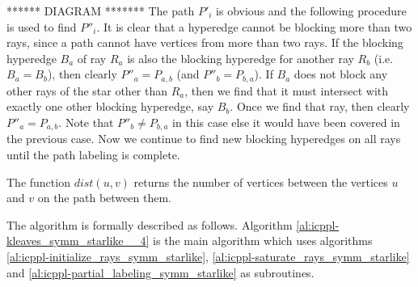\documentclass{llncs}
\begin{document}
****** DIAGRAM *******
The path $P'_i$ is obvious and the following procedure is used to find
$P''_i$. It is clear that a hyperedge cannot be blocking more than two rays,
since a path cannot have vertices from more than two rays. If the blocking 
hyperedge $B_a$ of ray $R_a$ is also the blocking hyperedge for
another ray $R_b$ (i.e. $B_a = B_b$), then clearly $P''_a = P_{a,b}$
(and $P''_b = P_{b,a}$). If $B_a$ does not block any other rays of the
star other than $R_a$, then we find that it must intersect with
exactly one other blocking hyperedge, say $B_b$. Once we find that
ray,  then clearly $P''_a = P_{a,b}$. Note that $P''_b \ne P_{b,a}$ in
this case else it would have been covered in the previous case.
Now we continue to find new blocking hyperedges on all rays until the
path labeling is complete. 

\noindent
The function $dist(u,v)$ returns the number of vertices between the
vertices $u$ and $v$ on the path between them. 

The algorithm is formally described as follows. Algorithm
\ref{al:icppl-kleaves_symm_starlike__4} is the main algorithm which
uses algorithms \ref{al:icppl-initialize_rays_symm_starlike},
\ref{al:icppl-saturate_rays_symm_starlike} and
\ref{al:icppl-partial_labeling_symm_starlike} as subroutines.
\end{document}
